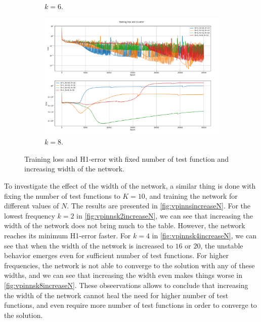\begin{figure}[h!]
\begin{subfigure}[b]{0.48\textwidth}
        \caption{$k=6$.}
        \label{fig:vpinnsk6increaseN}
    \end{subfigure}
    \hfill
    \begin{subfigure}[b]{0.48\textwidth}
        \includegraphics[width=\textwidth]{img/VPINN-Comparison-k8increaseN.png}
        \caption{$k=8$.}
        \label{fig:vpinnsk8increaseN}
    \end{subfigure}
    \caption{Training loss and H1-error with fixed number of test function and increasing width of the network.}
    \label{fig:vpinnsincreaseN}
\end{figure}

To investigate the effect of the width of the network, a similar thing is done with fixing the number of test functions to $K=10$, and training the network for different values of $N$. The results are presented in \autoref{fig:vpinnsincreaseN}. For the lowest frequency $k=2$ in \autoref{fig:vpinnsk2increaseN}, we can see that increasing the width of the network does not bring much to the table. However, the network reaches its minimum H1-error faster. For $k=4$ in \autoref{fig:vpinnsk4increaseN}, we can see that when the width of the network is increased to $16$ or $20$, the unstable behavior emerges even for sufficient number of test functions. For higher frequencies, the network is not able to converge to the solution with any of these widths, and we can see that increasing the width even makes things worse in \autoref{fig:vpinnsk8increaseN}. These obseervations allows to conclude that increasing the width of the network cannot heal the need for higher number of test functions, and even require more number of test functions in order to converge to the solution.


